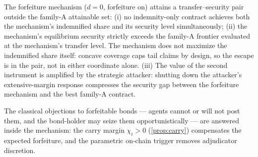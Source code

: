 \begin{proposition}[Decoupling]\label{prop:decoupling}
The forfeiture mechanism ($d = 0$, forfeiture on) attains a
transfer--security pair outside the family-A attainable set:
(i) no indemnity-only contract achieves both the mechanism's indemnified
share and its security level simultaneously; (ii) the mechanism's
equilibrium security strictly exceeds the family-A frontier evaluated at
the mechanism's transfer level. The mechanism does not maximize the
indemnified share itself: concave coverage caps tail claims by design,
so the escape is in the pair, not in either coordinate alone.
(iii) The value of the second instrument is amplified by the strategic
attacker: shutting down the attacker's extensive-margin response
compresses the security gap between the forfeiture mechanism and the
best family-A contract.
\end{proposition}

\begin{corollary}\label{cor:hostage}
The classical objections to forfeitable bonds --- agents cannot or will
not post them, and the bond-holder may seize them opportunistically ---
are answered inside the mechanism: the carry margin
$\chi_i > 0$ (\cref{prop:carry}) compensates the expected forfeiture, and
the parametric on-chain trigger removes adjudicator discretion.
\end{corollary}
